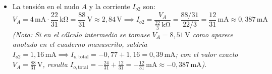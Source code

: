 \begin{ejercicio}
\begin{enumerate}
\begin{itemize}
        \begin{equation*}
            R_{eq,A} = 3\,\si{\kilo\ohm} \parallel \frac{22}{3}\,\si{\kilo\ohm} = \frac{3 \cdot \frac{22}{3}}{3 + \frac{22}{3}} = \frac{22}{31}\,\si{\kilo\ohm}
        \end{equation*}
        \item La tensión en el nudo $A$ y la corriente $I_{o2}$ son:
        \begin{equation*}
            V_A = 4\,\si{\milli\ampere} \cdot \frac{22}{31}\,\si{\kilo\ohm} = \frac{88}{31}\,\si{\volt} \approx 2{,}84\,\si{\volt} \implies I_{o2} = \frac{V_A}{\frac{22}{3}\,\si{\kilo\ohm}} = \frac{88/31}{22/3} = \frac{12}{31}\,\si{\milli\ampere} \approx 0{,}387\,\si{\milli\ampere}
        \end{equation*}
        \emph{(Nota: Si en el cálculo intermedio se tomase $V_A = 8{,}51\,\si{\volt}$ como aparece anotado en el cuaderno manuscrito, saldría $I_{o2} = 1{,}16\,\si{\milli\ampere} \implies I_{o,\text{total}} = -0{,}77 + 1{,}16 = 0{,}39\,\si{\milli\ampere}$; con el valor exacto $V_A = \frac{88}{31}\,\si{\volt}$, resulta $I_{o,\text{total}} = -\frac{24}{31} + \frac{12}{31} = -\frac{12}{31}\,\si{\milli\ampere} \approx -0{,}387\,\si{\milli\ampere}$)}.
    \end{itemize}
\end{enumerate}
\end{ejercicio}

